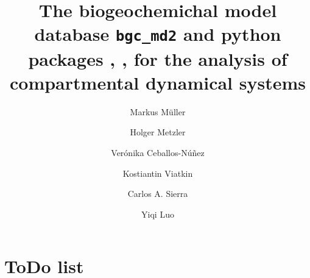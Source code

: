 
%
%

\title{The biogeochemichal model database \texttt{bgc\_md2} and python
packages  \LAPM, \CompartmentalSystems, \ComputabilityGraphs{} for the analysis of compartmental dynamical systems}
%
%






\author[2]{M{arkus M{\"{u}}ller}}
\author[4]{Holger Metzler}
\author[3]{Ver{\'{o}}nika Ceballos-N{\'{u}}{\~{n}}ez}
\author[2]{Kostiantin Viatkin}
\author[1]{Carlos A. Sierra}
\author[2]{Yiqi Luo}
\affil[3]{}
\affil[4]{}

\section{ToDo list}

\begin{abstract} \noindent
  
\end{abstract}

